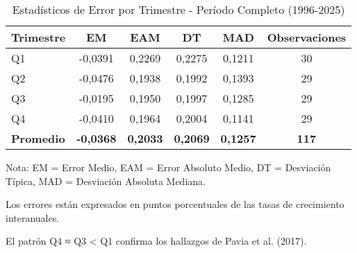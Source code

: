 \begin{table}[h]
\centering
\caption{Estadísticos de Error por Trimestre - Período Completo (1996-2025)}
\label{tab:errores_trimestre}
\begin{tabular}{lccccc}
\toprule
\textbf{Trimestre} & \textbf{EM} & \textbf{EAM} & \textbf{DT} & \textbf{MAD} & \textbf{Observaciones} \\
\midrule
Q1 & -0,0391 & 0,2269 & 0,2275 & 0,1211 & 30 \\
Q2 & -0,0476 & 0,1938 & 0,1992 & 0,1393 & 29 \\
Q3 & -0,0195 & 0,1950 & 0,1997 & 0,1285 & 29 \\
Q4 & -0,0410 & 0,1964 & 0,2004 & 0,1141 & 29 \\
\midrule
\textbf{Promedio} & \textbf{-0,0368} & \textbf{0,2033} & \textbf{0,2069} & \textbf{0,1257} & \textbf{117} \\
\bottomrule
\end{tabular}
\begin{tablenotes}
\footnotesize
\item Nota: EM = Error Medio, EAM = Error Absoluto Medio, DT = Desviación Típica, MAD = Desviación Absoluta Mediana.
\item Los errores están expresados en puntos porcentuales de las tasas de crecimiento interanuales.
\item El patrón Q4 ≈ Q3 < Q1 confirma los hallazgos de Pavia et al. (2017).
\end{tablenotes}
\end{table}
